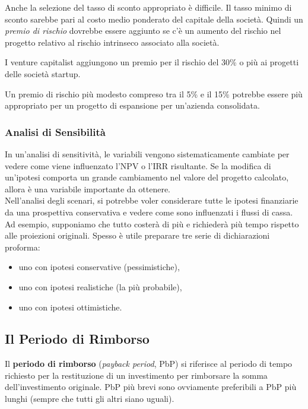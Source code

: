 \documentclass[a4paper,portrait,12pt]{article}
\theoremstyle{definition}
\begin{document}
Anche la selezione del tasso di sconto appropriato è difficile. Il tasso minimo di sconto sarebbe pari al costo medio ponderato del capitale della società.
Quindi un \emph{premio di rischio} dovrebbe essere aggiunto se c'è un aumento del rischio nel progetto relativo al rischio intrinseco associato alla società.

I venture capitalist aggiungono un premio per il rischio del 30\% o più ai progetti delle società startup.

Un premio di rischio più modesto compreso tra il 5\% e il 15\% potrebbe essere più appropriato per un progetto di espansione per un'azienda consolidata.

\subsubsection{Analisi di Sensibilità}

In un'analisi di sensitività, le variabili vengono sistematicamente cambiate per vedere come viene influenzato l'NPV o l'IRR risultante.
Se la modifica di un'ipotesi comporta un grande cambiamento nel valore del progetto calcolato, allora è una variabile importante da ottenere.\\

Nell'analisi degli scenari, si potrebbe voler considerare tutte le ipotesi finanziarie da una prospettiva conservativa e vedere come sono influenzati i flussi di cassa.
Ad esempio, supponiamo che tutto costerà di più e richiederà più tempo rispetto alle proiezioni originali.
Spesso è utile preparare tre serie di dichiarazioni proforma:
\begin{itemize}
\item uno con ipotesi conservative (pessimistiche),
\item uno con ipotesi realistiche (la più probabile),
\item uno con ipotesi ottimistiche.
\end{itemize}


\subsection{Il Periodo di Rimborso}


Il \textbf{periodo di rimborso} (\emph{payback period}, PbP) si riferisce al periodo di tempo richiesto per la restituzione di un investimento per rimborsare la somma dell'investimento originale.
PbP più brevi sono ovviamente preferibili a PbP più lunghi (sempre che tutti gli altri siano uguali).
\end{document}
